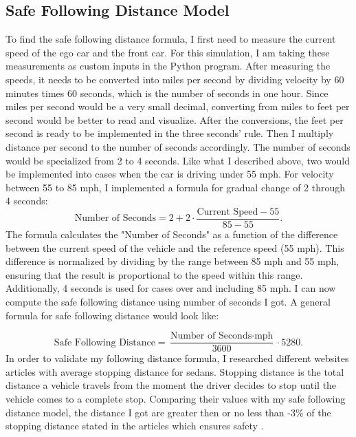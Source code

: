 \documentclass[12pt]{article}
\begin{document}
\subsection*{Safe Following Distance Model}

To find the safe following distance formula, I first need to measure the current speed of the ego car and the front car. For this simulation, I am taking these measurements as custom inputs in the Python program. After measuring the speeds, it needs to be converted into miles per second by dividing velocity by 60 minutes times 60 seconds, which is the number of seconds in one hour. Since miles per second would be a very small decimal, converting from miles to feet per second would be better to read and visualize. After the conversions, the feet per second is ready to be implemented in the three seconds’ rule. Then I multiply distance per second to the number of seconds accordingly.
The number of seconds would be specialized from 2 to 4 seconds. Like what I described above, two would be implemented into cases when the car is driving under 55 mph. For velocity between 55 to 85 mph, I implemented a formula for gradual change of 2 through 4 seconds: 
\[
\text{Number of Seconds} = 2 + 2 \cdot \frac{\text{Current Speed} - 55}{85 - 55}.
\]
The formula calculates the "Number of Seconds" as a function of the difference between the current speed of the vehicle and the reference speed (55 mph). This difference is normalized by dividing by the range between 85 mph and 55 mph, ensuring that the result is proportional to the speed within this range. Additionally, 4 seconds is used for cases over and including 85 mph. I can now compute the safe following distance using number of seconds I got. A general formula for safe following distance would look like:

\begin{equation}
\text{Safe Following Distance} = \frac{\text{Number of Seconds} \cdot \text{mph}}{3600} \cdot 5280.
\label{eq:following_distance}
\end{equation}
In order to validate my following distance formula, I researched different websites articles with average stopping distance for sedans. Stopping distance is the total distance a vehicle travels from the moment the driver decides to stop until the vehicle comes to a complete stop. Comparing their values with my safe following distance model, the distance I got are greater then or no less than -3\% of the stopping distance stated in the articles which ensures safety \cite{brake_stopping_distances}.
\end{document}
